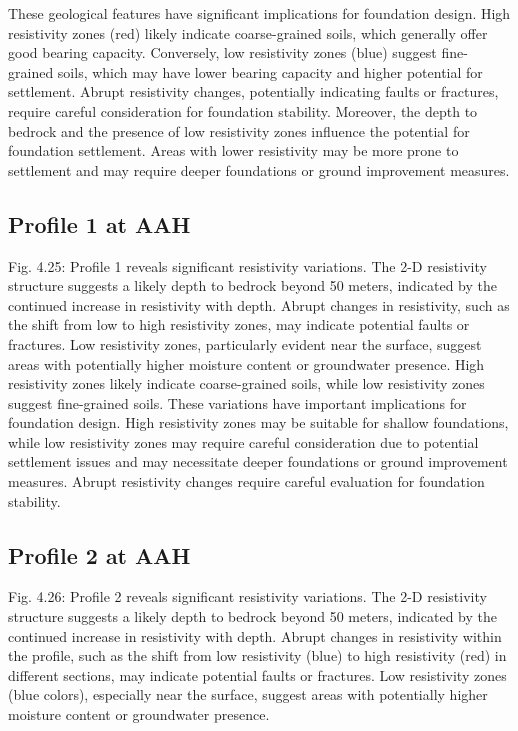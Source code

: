 \documentclass[12pt,a4paper]{report}
\begin{document}
These geological features have significant implications for foundation design. High resistivity zones (red) likely indicate coarse-grained soils, which generally offer good bearing capacity. Conversely, low resistivity zones (blue) suggest fine-grained soils, which may have lower bearing capacity and higher potential for settlement. Abrupt resistivity changes, potentially indicating faults or fractures, require careful consideration for foundation stability. Moreover, the depth to bedrock and the presence of low resistivity zones influence the potential for foundation settlement. Areas with lower resistivity may be more prone to settlement and may require deeper foundations or ground improvement measures.

\subsection{Profile 1 at AAH}
Fig. 4.25: Profile 1 reveals significant resistivity variations. The 2-D resistivity structure suggests a likely depth to bedrock beyond 50 meters, indicated by the continued increase in resistivity with depth. Abrupt changes in resistivity, such as the shift from low to high resistivity zones, may indicate potential faults or fractures. Low resistivity zones, particularly evident near the surface, suggest areas with potentially higher moisture content or groundwater presence. High resistivity zones likely indicate coarse-grained soils, while low resistivity zones suggest fine-grained soils. These variations have important implications for foundation design. High resistivity zones may be suitable for shallow foundations, while low resistivity zones may require careful consideration due to potential settlement issues and may necessitate deeper foundations or ground improvement measures. Abrupt resistivity changes require careful evaluation for foundation stability.

\subsection{Profile 2 at AAH}
Fig. 4.26: Profile 2 reveals significant resistivity variations. The 2-D resistivity structure suggests a likely depth to bedrock beyond 50 meters, indicated by the continued increase in resistivity with depth. Abrupt changes in resistivity within the profile, such as the shift from low resistivity (blue) to high resistivity (red) in different sections, may indicate potential faults or fractures. Low resistivity zones (blue colors), especially near the surface, suggest areas with potentially higher moisture content or groundwater presence.
\end{document}
